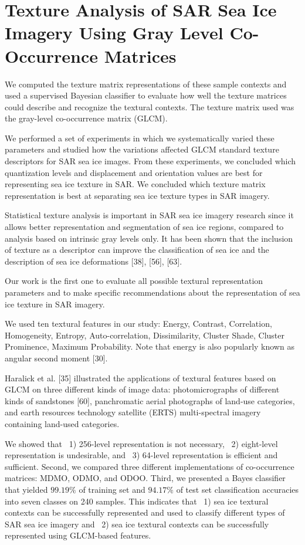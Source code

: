 \documentclass[paper=a4, fontsize=11pt]{scrartcl}
\begin{document}
\newpage

\section*{\textcolor{VioletRed4}{Texture Analysis of SAR Sea Ice Imagery Using Gray Level Co-Occurrence Matrices}}

We computed the texture matrix representations of these sample contexts and used a supervised Bayesian classifier to evaluate how well the texture matrices could describe and recognize the textural contexts.
The texture matrix used was the gray-level co-occurrence matrix (GLCM).

We performed a set of experiments in which we systematically varied these parameters and studied how the variations affected GLCM standard texture descriptors for SAR sea ice images. 
From these experiments, we concluded which quantization levels and displacement and orientation values are best for representing sea ice texture in SAR.
We concluded which texture matrix representation is best at separating sea ice texture types in SAR imagery.

Statistical texture analysis is important in SAR sea ice imagery research since it allows better representation and segmentation of sea ice regions, compared to analysis based on intrinsic gray levels only. 
It has been shown that the inclusion of texture as a descriptor can improve the classification of sea ice and the description of sea ice deformations [38], [56], [63].

Our work is the first one to evaluate all possible textural representation parameters and to make specific recommendations about the representation of sea ice texture in SAR imagery.

We used ten textural features in our study: Energy, Contrast, Correlation, Homogeneity, Entropy, Auto-correlation, Dissimilarity, Cluster Shade, Cluster Prominence, Maximum Probability.
Note that energy is also popularly known as angular second moment [30].

Haralick et al. [35] illustrated the applications of textural features based on GLCM on three different kinds of image data: photomicrographs of different kinds of sandstones [60], panchromatic aerial photographs of land-use categories, and earth resources technology satellite (ERTS) multi-spectral imagery containing land-used categories.

We showed that 
~1) 256-level representation is not necessary, 
~2) eight-level representation is undesirable, and 
~3) 64-level representation is efficient and sufficient.
Second, we compared three different implementations of co-occurrence matrices: MDMO, ODMO, and ODOO.
Third, we presented a Bayes classifier that yielded $99.19\%$ of training set and $94.17\%$ of test set classification accuracies into seven classes on 240 samples.
This indicates that 
~1) sea ice textural contexts can be successfully represented and used to classify different types of SAR sea ice imagery and 
~2) sea ice textural contexts can be successfully represented using GLCM-based features.
\end{document}
